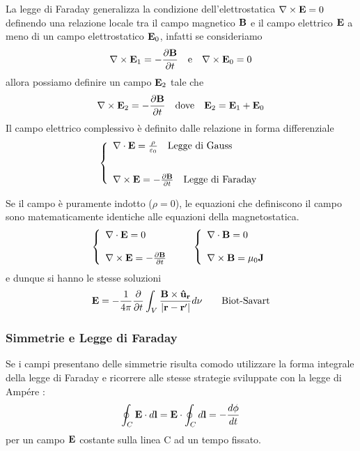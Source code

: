 La legge di Faraday generalizza la  condizione dell'elettrostatica  $\nabla \times \bold{E} = 0$ definendo una relazione locale tra il campo magnetico $\bold{B}$ e il campo elettrico $\bold{E}$ a meno di un campo elettrostatico $\bold{E}_0$, infatti se consideriamo 
\begin{align*}
	\nabla \times \bold{E}_1 = - \frac{\partial \bold{B}}{\partial t} \quad \text{e} \quad \nabla \times \bold{E}_0 = 0
\end{align*}
allora possiamo definire un campo $\bold{E}_2$ tale che 
\begin{equation*}
	\nabla \times \bold{E}_2 = - \frac{\partial \bold{B}}{\partial t} \quad \text{dove} \quad \bold{E}_2 = \bold{E}_1 + \bold{E}_0
\end{equation*}
\newpage 
Il campo elettrico complessivo \`e definito dalle relazione in forma differenziale 
\begin{align*}
	\left \{ \begin{array}{l}
		\nabla \cdot \bold{E} = \frac{\rho}{\varepsilon_0} \quad \text{Legge di Gauss} \\ \rule{0pt}{30pt}
		\nabla \times \bold{E} = - \frac{\partial \bold{B}}{\partial t} \quad \text{Legge di Faraday}
	\end{array}\right.
\end{align*}

Se il campo \`e puramente indotto ($\rho = 0$), le equazioni che definiscono il campo sono matematicamente identiche alle equazioni della magnetostatica.
\begin{align*}
	\left \{ \begin{array}{l}
	\nabla \cdot \bold{E} = 0 \\ \rule{0pt}{20pt} 
	\nabla \times \bold{E} = - \frac{\partial \bold{B}}{\partial t}		
	\end{array}\right.
	\quad \quad  
	\left \{ \begin{array}{l}
	\nabla \cdot \bold{B} = 0 \\ \rule{0pt}{20pt} 
	\nabla \times \bold{B} = \mu_0 \bold{J}		
	\end{array}\right.
\end{align*}
e dunque si hanno le stesse soluzioni 
\begin{equation*}
	\bold{E} = - \frac{1}{4 \pi } \frac{\partial}{\partial t} \int_{V} \frac{\bold{B} \times \bold{\hat{u}_r}}{|\bold{r} - \bold{r}'|}d \nu \quad \quad \text{Biot-Savart}
\end{equation*}

\subsubsection{Simmetrie e Legge di Faraday}
Se i campi presentano delle simmetrie risulta comodo utilizzare la forma integrale della legge di Faraday e ricorrere alle stesse strategie sviluppate con la legge di Amp\'ere :
\begin{equation*}
	\oint_{C} \bold{E} \cdot d\bold{l} = \bold{E} \cdot \oint_{C}d\bold{l} = - \frac{d \phi}{dt}
\end{equation*}
per un campo $\bold{E}$ costante sulla linea C ad un tempo fissato.
